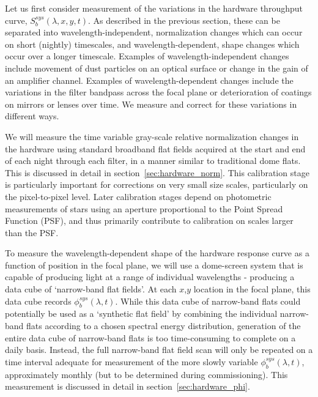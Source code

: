 \documentclass[12pt,preprint]{aastex}
\begin{document}
Let us first consider measurement of the variations in the hardware
throughput curve, $S_b^{sys}(\lambda,x,y,t)$. As described in the
previous section, these can be separated into wavelength-independent,
normalization changes which can occur on short (nightly) timescales,
and wavelength-dependent, shape changes which occur over a longer
timescale. Examples of wavelength-independent changes include movement
of dust particles on an optical surface or change in the gain of an
amplifier channel. Examples of wavelength-dependent changes include
the variations in the filter bandpass across the focal plane or
deterioration of coatings on mirrors or lenses over time. We measure
and correct for these variations in different ways.

We will measure the time variable gray-scale relative
normalization changes in the hardware using standard broadband flat
fields acquired at the start and end of each night through each
filter, in a manner similar to traditional dome flats. This is
discussed in detail in section~\ref{sec:hardware_norm}.  This
calibration stage is particularly important for corrections on very
small size scales, particularly on the pixel-to-pixel level. Later
calibration stages depend on photometric measurements of stars using
an aperture proportional to the Point Spread Function (PSF), and thus
primarily contribute to calibration on scales larger than the PSF.

To measure the wavelength-dependent shape of the hardware response
curve as a function of position in the focal plane, we will use a
dome-screen system that is capable of producing light at a range of
individual wavelengths - producing a data cube of `narrow-band flat
fields'.  At each $x$,$y$ location in the focal plane, this data cube
records $\phi_b^{sys}(\lambda,t)$. While this data cube of narrow-band
flats could potentially be used as a `synthetic flat field' by
combining the individual narrow-band flats according to a chosen
spectral energy distribution, generation of the entire data cube of
narrow-band flats is too time-consuming to complete on a daily
basis. Instead, the full narrow-band flat field scan will only be
repeated on a time interval adequate for measurement of
the more slowly variable $\phi_b^{sys}(\lambda,t)$, approximately
monthly (but to be determined during commissioning). This measurement
is discussed in detail in section~\ref{sec:hardware_phi}.
\end{document}

